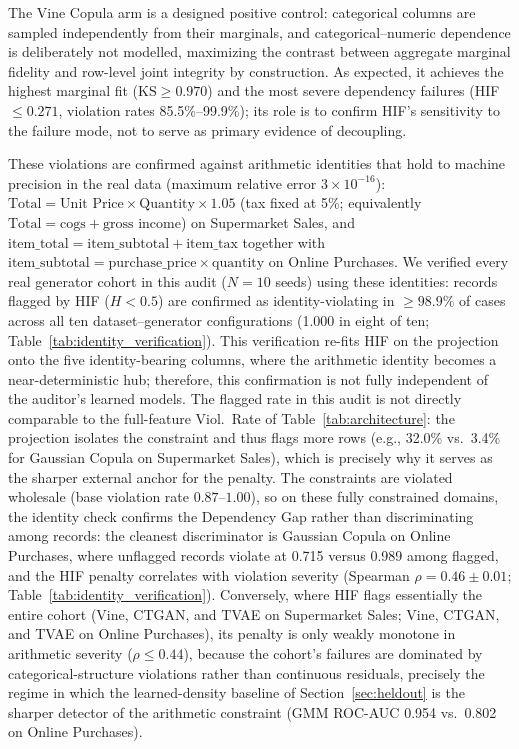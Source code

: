 \documentclass[pdflatex,sn-mathphys-num]{sn-jnl}
\theoremstyle{thmstyleone}%
\theoremstyle{thmstyletwo}%
\theoremstyle{thmstylethree}%
\begin{document}
The Vine Copula arm is a designed positive control: categorical columns are sampled independently from their marginals, and categorical--numeric dependence is deliberately not modelled, maximizing the contrast between aggregate marginal fidelity and row-level joint integrity by construction. As expected, it achieves the highest marginal fit ($\text{KS} \ge 0.970$) and the most severe dependency failures (HIF $\le 0.271$, violation rates 85.5\%--99.9\%); its role is to confirm HIF's sensitivity to the failure mode, not to serve as primary evidence of decoupling.

These violations are confirmed against arithmetic identities that hold to machine precision in the real data (maximum relative error $3 \times 10^{-16}$): $\text{Total} = \text{Unit Price} \times \text{Quantity} \times 1.05$ (tax fixed at 5\%; equivalently $\text{Total} = \text{cogs} + \text{gross income}$) on Supermarket Sales, and $\text{item\_total} = \text{item\_subtotal} + \text{item\_tax}$ together with $\text{item\_subtotal} = \text{purchase\_price} \times \text{quantity}$ on Online Purchases. We verified every real generator cohort in this audit ($N=10$ seeds) using these identities: records flagged by HIF ($H < 0.5$) are confirmed as identity-violating in $\ge 98.9\%$ of cases across all ten dataset--generator configurations (1.000 in eight of ten; Table~\ref{tab:identity_verification}). This verification re-fits HIF on the projection onto the five identity-bearing columns, where the arithmetic identity becomes a near-deterministic hub; therefore, this confirmation is not fully independent of the auditor's learned models. The flagged rate in this audit is not directly comparable to the full-feature Viol.\ Rate of Table~\ref{tab:architecture}: the projection isolates the constraint and thus flags more rows (e.g., 32.0\% vs.\ 3.4\% for Gaussian Copula on Supermarket Sales), which is precisely why it serves as the sharper external anchor for the penalty. The constraints are violated wholesale (base violation rate $0.87$--$1.00$), so on these fully constrained domains, the identity check confirms the Dependency Gap rather than discriminating among records: the cleanest discriminator is Gaussian Copula on Online Purchases, where unflagged records violate at 0.715 versus 0.989 among flagged, and the HIF penalty correlates with violation severity (Spearman $\rho = 0.46 \pm 0.01$; Table~\ref{tab:identity_verification}). Conversely, where HIF flags essentially the entire cohort (Vine, CTGAN, and TVAE on Supermarket Sales; Vine, CTGAN, and TVAE on Online Purchases), its penalty is only weakly monotone in arithmetic severity ($\rho \le 0.44$), because the cohort's failures are dominated by categorical-structure violations rather than continuous residuals, precisely the regime in which the learned-density baseline of Section~\ref{sec:heldout} is the sharper detector of the arithmetic constraint (GMM ROC-AUC 0.954 vs.\ 0.802 on Online Purchases).
\end{document}
